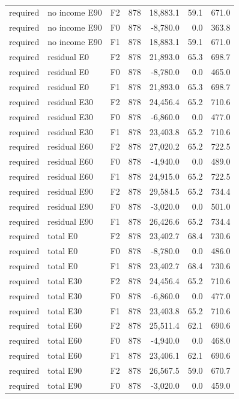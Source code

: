 \begin{longtable}{p{1.8cm}p{3.35cm}lrrrr}
required & no income E90 & F2 & 878 & 18,883.1 & 59.1 & 671.0\\
required & no income E90 & F0 & 878 & -8,780.0 & 0.0 & 363.8\\
required & no income E90 & F1 & 878 & 18,883.1 & 59.1 & 671.0\\
required & residual E0 & F2 & 878 & 21,893.0 & 65.3 & 698.7\\
required & residual E0 & F0 & 878 & -8,780.0 & 0.0 & 465.0\\
required & residual E0 & F1 & 878 & 21,893.0 & 65.3 & 698.7\\
required & residual E30 & F2 & 878 & 24,456.4 & 65.2 & 710.6\\
required & residual E30 & F0 & 878 & -6,860.0 & 0.0 & 477.0\\
required & residual E30 & F1 & 878 & 23,403.8 & 65.2 & 710.6\\
required & residual E60 & F2 & 878 & 27,020.2 & 65.2 & 722.5\\
required & residual E60 & F0 & 878 & -4,940.0 & 0.0 & 489.0\\
required & residual E60 & F1 & 878 & 24,915.0 & 65.2 & 722.5\\
required & residual E90 & F2 & 878 & 29,584.5 & 65.2 & 734.4\\
required & residual E90 & F0 & 878 & -3,020.0 & 0.0 & 501.0\\
required & residual E90 & F1 & 878 & 26,426.6 & 65.2 & 734.4\\
required & total E0 & F2 & 878 & 23,402.7 & 68.4 & 730.6\\
required & total E0 & F0 & 878 & -8,780.0 & 0.0 & 486.0\\
required & total E0 & F1 & 878 & 23,402.7 & 68.4 & 730.6\\
required & total E30 & F2 & 878 & 24,456.4 & 65.2 & 710.6\\
required & total E30 & F0 & 878 & -6,860.0 & 0.0 & 477.0\\
required & total E30 & F1 & 878 & 23,403.8 & 65.2 & 710.6\\
required & total E60 & F2 & 878 & 25,511.4 & 62.1 & 690.6\\
required & total E60 & F0 & 878 & -4,940.0 & 0.0 & 468.0\\
required & total E60 & F1 & 878 & 23,406.1 & 62.1 & 690.6\\
required & total E90 & F2 & 878 & 26,567.5 & 59.0 & 670.7\\
required & total E90 & F0 & 878 & -3,020.0 & 0.0 & 459.0\\

\end{longtable}
